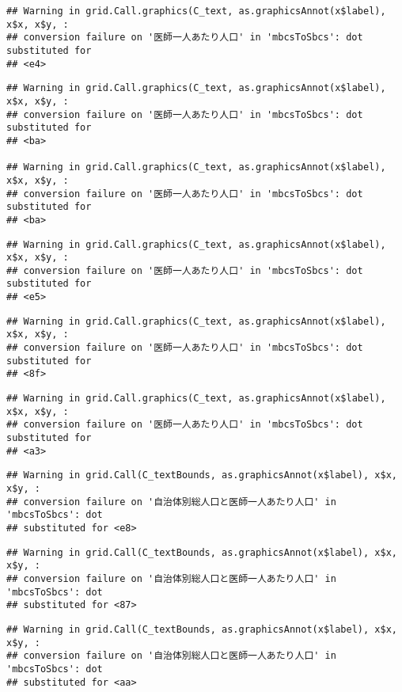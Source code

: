 \documentclass[
]{article}
\begin{document}
\begin{verbatim}
## Warning in grid.Call.graphics(C_text, as.graphicsAnnot(x$label), x$x, x$y, :
## conversion failure on '医師一人あたり人口' in 'mbcsToSbcs': dot substituted for
## <e4>
\end{verbatim}

\begin{verbatim}
## Warning in grid.Call.graphics(C_text, as.graphicsAnnot(x$label), x$x, x$y, :
## conversion failure on '医師一人あたり人口' in 'mbcsToSbcs': dot substituted for
## <ba>

## Warning in grid.Call.graphics(C_text, as.graphicsAnnot(x$label), x$x, x$y, :
## conversion failure on '医師一人あたり人口' in 'mbcsToSbcs': dot substituted for
## <ba>
\end{verbatim}

\begin{verbatim}
## Warning in grid.Call.graphics(C_text, as.graphicsAnnot(x$label), x$x, x$y, :
## conversion failure on '医師一人あたり人口' in 'mbcsToSbcs': dot substituted for
## <e5>
\end{verbatim}

\begin{verbatim}
## Warning in grid.Call.graphics(C_text, as.graphicsAnnot(x$label), x$x, x$y, :
## conversion failure on '医師一人あたり人口' in 'mbcsToSbcs': dot substituted for
## <8f>
\end{verbatim}

\begin{verbatim}
## Warning in grid.Call.graphics(C_text, as.graphicsAnnot(x$label), x$x, x$y, :
## conversion failure on '医師一人あたり人口' in 'mbcsToSbcs': dot substituted for
## <a3>
\end{verbatim}

\begin{verbatim}
## Warning in grid.Call(C_textBounds, as.graphicsAnnot(x$label), x$x, x$y, :
## conversion failure on '自治体別総人口と医師一人あたり人口' in 'mbcsToSbcs': dot
## substituted for <e8>
\end{verbatim}

\begin{verbatim}
## Warning in grid.Call(C_textBounds, as.graphicsAnnot(x$label), x$x, x$y, :
## conversion failure on '自治体別総人口と医師一人あたり人口' in 'mbcsToSbcs': dot
## substituted for <87>
\end{verbatim}

\begin{verbatim}
## Warning in grid.Call(C_textBounds, as.graphicsAnnot(x$label), x$x, x$y, :
## conversion failure on '自治体別総人口と医師一人あたり人口' in 'mbcsToSbcs': dot
## substituted for <aa>
\end{verbatim}
\end{document}
